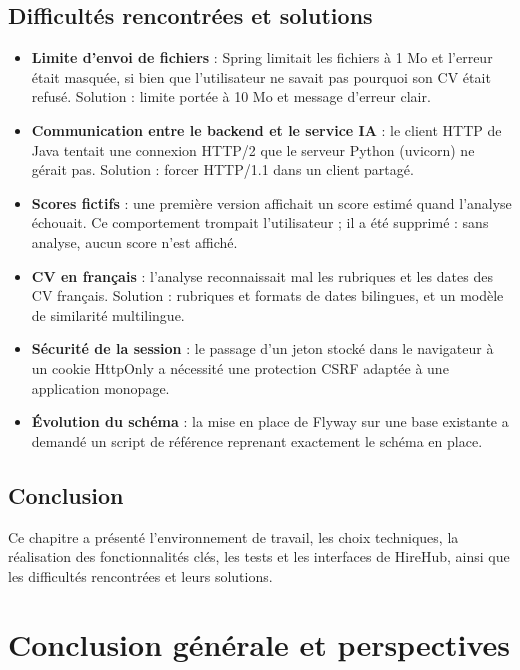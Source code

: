 \documentclass[12pt,a4paper]{report}
\begin{document}
\section{Difficultés rencontrées et solutions}
\begin{itemize}
  \item \textbf{Limite d'envoi de fichiers} : Spring limitait les fichiers à 1 Mo et l'erreur était masquée, si bien que l'utilisateur ne savait pas pourquoi son CV était refusé. Solution : limite portée à 10 Mo et message d'erreur clair.
  \item \textbf{Communication entre le backend et le service IA} : le client HTTP de Java tentait une connexion HTTP/2 que le serveur Python (uvicorn) ne gérait pas. Solution : forcer HTTP/1.1 dans un client partagé.
  \item \textbf{Scores fictifs} : une première version affichait un score estimé quand l'analyse échouait. Ce comportement trompait l'utilisateur ; il a été supprimé : sans analyse, aucun score n'est affiché.
  \item \textbf{CV en français} : l'analyse reconnaissait mal les rubriques et les dates des CV français. Solution : rubriques et formats de dates bilingues, et un modèle de similarité multilingue.
  \item \textbf{Sécurité de la session} : le passage d'un jeton stocké dans le navigateur à un cookie HttpOnly a nécessité une protection CSRF adaptée à une application monopage.
  \item \textbf{Évolution du schéma} : la mise en place de Flyway sur une base existante a demandé un script de référence reprenant exactement le schéma en place.
\end{itemize}

\section*{Conclusion}
Ce chapitre a présenté l'environnement de travail, les choix techniques, la réalisation des fonctionnalités clés, les tests et les interfaces de HireHub, ainsi que les difficultés rencontrées et leurs solutions.

\chapter*{Conclusion générale et perspectives}
\end{document}
